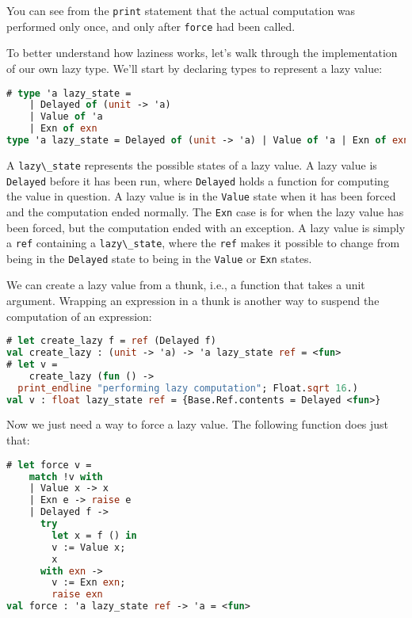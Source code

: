 You can see from the \passthrough{\lstinline!print!} statement that the
actual computation was performed only once, and only after
\passthrough{\lstinline!force!} had been called.

To better understand how laziness works, let's walk through the
implementation of our own lazy type. We'll start by declaring types to
represent a lazy value:

\begin{lstlisting}[language=Caml]
# type 'a lazy_state =
    | Delayed of (unit -> 'a)
    | Value of 'a
    | Exn of exn
type 'a lazy_state = Delayed of (unit -> 'a) | Value of 'a | Exn of exn
\end{lstlisting}

A \passthrough{\lstinline!lazy\_state!} represents the possible states
of a lazy value. A lazy value is \passthrough{\lstinline!Delayed!}
before it has been run, where \passthrough{\lstinline!Delayed!} holds a
function for computing the value in question. A lazy value is in the
\passthrough{\lstinline!Value!} state when it has been forced and the
computation ended normally. The \passthrough{\lstinline!Exn!} case is
for when the lazy value has been forced, but the computation ended with
an exception. A lazy value is simply a \passthrough{\lstinline!ref!}
containing a \passthrough{\lstinline!lazy\_state!}, where the
\passthrough{\lstinline!ref!} makes it possible to change from being in
the \passthrough{\lstinline!Delayed!} state to being in the
\passthrough{\lstinline!Value!} or \passthrough{\lstinline!Exn!} states.

We can create a lazy value from a thunk, i.e., a function that takes a
unit argument. Wrapping an expression in a thunk is another way to
suspend the computation of an expression: 

\begin{lstlisting}[language=Caml]
# let create_lazy f = ref (Delayed f)
val create_lazy : (unit -> 'a) -> 'a lazy_state ref = <fun>
# let v =
    create_lazy (fun () ->
  print_endline "performing lazy computation"; Float.sqrt 16.)
val v : float lazy_state ref = {Base.Ref.contents = Delayed <fun>}
\end{lstlisting}

Now we just need a way to force a lazy value. The following function
does just that:

\begin{lstlisting}[language=Caml]
# let force v =
    match !v with
    | Value x -> x
    | Exn e -> raise e
    | Delayed f ->
      try
        let x = f () in
        v := Value x;
        x
      with exn ->
        v := Exn exn;
        raise exn
val force : 'a lazy_state ref -> 'a = <fun>
\end{lstlisting}

